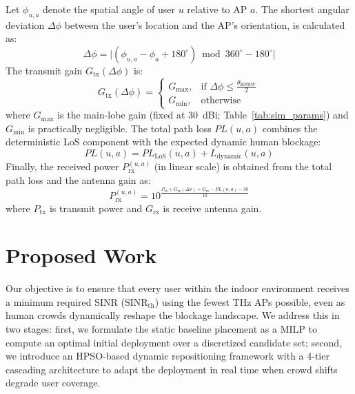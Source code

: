 \documentclass[conference]{IEEEtran}
\begin{document}
	Let $\phi_{u,a}$ denote the spatial angle of user $u$ relative to AP $a$. The shortest angular deviation $\Delta\phi$ between the user's location and the AP's orientation, is calculated as:
	\begin{equation}
		\Delta\phi = \big|(\phi_{u,a} - \phi_a + 180^{\circ}) \bmod 360^{\circ} - 180^{\circ}\big|
		\label{eq:ang_dev}
	\end{equation}
	The transmit gain $G_{\text{tx}}(\Delta\phi)$ is:
	\begin{equation}
		G_{\text{tx}}(\Delta\phi) = 
		\begin{cases} 
			G_{\text{max}}, & \text{if } \Delta\phi \le \frac{\theta_{\text{HPBW}}}{2} \\
			G_{\text{min}}, & \text{otherwise}
		\end{cases}
		\label{eq:beamwidth}
	\end{equation}
	where $G_{\text{max}}$ is the main-lobe gain (fixed at 30~dBi; Table~\ref{tab:sim_params}) and $G_{\text{min}}$ is practically negligible. The total path loss $PL(u,a)$ combines the deterministic LoS component with the expected dynamic human blockage:
	\begin{equation}
		PL(u,a) = PL_{\text{LoS}}(u,a) + L_{\text{dynamic}}(u,a)
		\label{eq:total_pl_combined}
	\end{equation}
	Finally, the received power $P_{\text{rx}}^{(u,a)}$ (in linear scale) is obtained from the total path loss and the antenna gain as:
	\begin{equation}
		P_{\text{rx}}^{(u,a)} = 10^{\frac{P_{\text{tx}} + G_{\text{tx}}(\Delta\phi) + G_{\text{rx}} - PL(u,a) - 30}{10}}
	\end{equation}
	where $P_{\text{tx}}$ is transmit power and $G_{\text{rx}}$ is receive antenna gain.
	
	\section{Proposed Work}
	
	Our objective is to ensure that every user within the indoor environment receives a minimum required SINR ($\text{SINR}_{\text{th}}$) using the fewest THz APs possible, even as human crowds dynamically reshape the blockage landscape. We address this in two stages: first, we formulate the static baseline placement as a MILP to compute an optimal initial deployment over a discretized candidate set; second, we introduce an HPSO-based dynamic repositioning framework with a 4-tier cascading architecture to adapt the deployment in real time when crowd shifts degrade user coverage.
	
\end{document}
